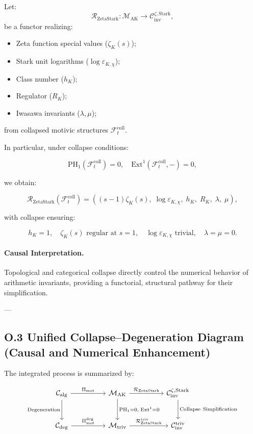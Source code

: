 \documentclass[11pt]{article}
\begin{document}
Let:
\[
\mathcal{R}_{\mathrm{ZetaStark}} : \mathcal{M}_{\mathrm{AK}} \longrightarrow \mathcal{C}_{\mathrm{inv}}^{\zeta, \mathrm{Stark}},
\]
be a functor realizing:

\begin{itemize}
  \item Zeta function special values (\( \zeta_K(s) \));
  \item Stark unit logarithms (\( \log \varepsilon_{K,\chi} \));
  \item Class number (\( h_K \));
  \item Regulator (\( R_K \));
  \item Iwasawa invariants (\( \lambda, \mu \));
\end{itemize}

from collapsed motivic structures \( \mathcal{F}_t^{\mathrm{coll}} \).

In particular, under collapse conditions:

\[
\mathrm{PH}_1(\mathcal{F}_t^{\mathrm{coll}}) = 0, \quad \mathrm{Ext}^1(\mathcal{F}_t^{\mathrm{coll}}, -) = 0,
\]

we obtain:

\[
\mathcal{R}_{\mathrm{ZetaStark}}(\mathcal{F}_t^{\mathrm{coll}}) =
\left( (s - 1)\zeta_K(s),\; \log \varepsilon_{K,\chi},\; h_K,\; R_K,\; \lambda,\; \mu \right),
\]

with collapse ensuring:

\[
h_K = 1, \quad \zeta_K(s) \text{ regular at } s = 1, \quad \log \varepsilon_{K,\chi} \text{ trivial}, \quad \lambda = \mu = 0.
\]

\paragraph{Causal Interpretation.}
Topological and categorical collapse directly control the numerical behavior of arithmetic invariants, providing a functorial, structural pathway for their simplification.

---

\subsection*{O.3 Unified Collapse–Degeneration Diagram (Causal and Numerical Enhancement)}

The integrated process is summarized by:

\[
\begin{tikzcd}[column sep=huge, row sep=large]
\mathcal{C}_{\mathrm{alg}} \arrow[r, "{\Pi_{\mathrm{mot}}}"] \arrow[d, "{\mathrm{Degeneration}}"']
& \mathcal{M}_{\mathrm{AK}} \arrow[r, "{\mathcal{R}_{\mathrm{ZetaStark}}}"] \arrow[d, "{\mathrm{PH}_1 = 0,\; \mathrm{Ext}^1 = 0}"]
& \mathcal{C}_{\mathrm{inv}}^{\zeta,\mathrm{Stark}} \arrow[d, "{\mathrm{Collapse\ Simplification}}"] \\
\mathcal{C}_{\mathrm{deg}} \arrow[r, "{\Pi_{\mathrm{mot}}^{\mathrm{deg}}}"]
& \mathcal{M}_{\mathrm{triv}} \arrow[r, "{\mathcal{R}_{\mathrm{ZetaStark}}^{\mathrm{triv}}}"]
& \mathcal{C}_{\mathrm{inv}}^{\mathrm{triv}}
\end{tikzcd}
\]
\end{document}
